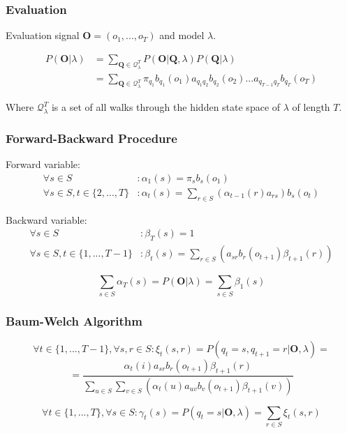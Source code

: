 \begin{frame}
	\frametitle{Evaluation}
	
	Evaluation signal $\mathbf{O}=(o_1,...,o_T)$ and model $\lambda$.
	
	\begin{align*}
		P(\mathbf{O}|\lambda)&=\sum_{\mathbf{Q}\in\mathcal{Q}^T_\lambda}{P(\mathbf{O}|\mathbf{Q},\lambda)P(\mathbf{Q}|\lambda)}\\
		&=\sum_{\mathbf{Q}\in\mathcal{Q}^T_\lambda}{\pi_{q_1}b_{q_1}(o_1)a_{q_1q_2}b_{q_2}(o_2)...a_{q_{T-1}q_T}b_{q_T}(o_T)}
	\end{align*}
	
	Where $\mathcal{Q}_\lambda^T$ is a set of all walks through the hidden state space of $\lambda$ of length $T$.
\end{frame}

\begin{frame}
	\frametitle{Forward-Backward Procedure}
	
	Forward variable:
	\begin{align*}
		\forall s\in S&: \alpha_1(s)=\pi_sb_{s}(o_1)\\
		\forall s\in S, t\in\{2, ..., T\}&: \alpha_t(s) = \sum_{r \in S}{(\alpha_{t-1}(r)a_{rs})}b_{s}(o_t)
	\end{align*}
	
	Backward variable:
	\begin{align*}
		\forall s\in S&:\beta_T(s)=1\\
		\forall s\in S, t\in\{1, ..., T-1\}&:\beta_t(s)=\sum_{r\in S}{(a_{sr}b_{r}(o_{t+1})\beta_{t+1}(r))}
	\end{align*}
	
	$$\sum_{s\in S}{\alpha_T(s)} = P(\mathbf{O}|\lambda)=\sum_{s\in S}{\beta_1(s)}$$
	
\end{frame}

\begin{frame}
	\frametitle{Baum-Welch Algorithm}
	
	$$\forall t\in\{1,...,T-1\},\forall s,r\in S: \xi_t(s,r) = P(q_t =s, q_{t+1}=r|\mathbf{O},\lambda)=$$
	$$=\frac{\alpha_t(i)a_{sr}b_{r}(o_{t+1})\beta_{t+1}(r)}{\sum_{u\in S}\sum_{v\in S}(\alpha_t(u)a_{uv}b_{v}(o_{t+1})\beta_{t+1}(v))}$$
		
	$$\forall t\in\{1,...,T\},\forall s\in S: \gamma_t(s) =P(q_t=s|\mathbf{O},\lambda)=\sum_{r\in S}\xi_t(s,r)$$
\end{frame}

